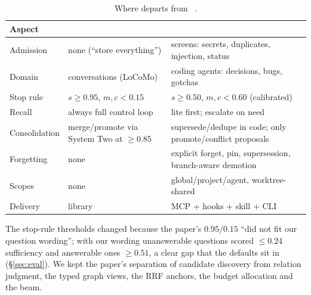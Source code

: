 \begin{table}[h]
\caption{Where \jevmem{} departs from \jevmempaper{}~\cite{jiang2026jevmem}.}
\label{tab:dev}
\small
\begin{tabular}{@{}p{1.9cm}p{2.3cm}p{2.9cm}@{}}
\toprule
Aspect & \jevmempaper{} & \jevmem{} \\
\midrule
Admission & none (``store everything'') & screens: secrets, duplicates, injection, status \\
Domain & conversations (LoCoMo) & coding agents: decisions, bugs, gotchas \\
Stop rule & $s\ge0.95$, $m,c<0.15$ & $s\ge0.50$, $m,c<0.60$ (calibrated) \\
Recall & always full control loop & lite first; escalate on need \\
Consolidation & merge/promote via System Two at $\ge0.85$ & supersede/dedupe in code; only promote/conflict proposals \\
Forgetting & none & explicit forget, pin, supersession, branch-aware demotion \\
Scopes & none & global/project/agent, worktree-shared \\
Delivery & library & MCP + hooks + skill + CLI \\
\bottomrule
\end{tabular}
\end{table}

The stop-rule thresholds changed because the paper's $0.95/0.15$ ``did not fit our question wording''; with our wording unanswerable questions scored $\le 0.24$ sufficiency and answerable ones $\ge 0.51$, a clear gap that the defaults sit in (\S\ref{sec:eval}). We kept the paper's separation of candidate discovery from relation judgment, the typed graph views, the RRF anchors, the budget allocation and the beam.
